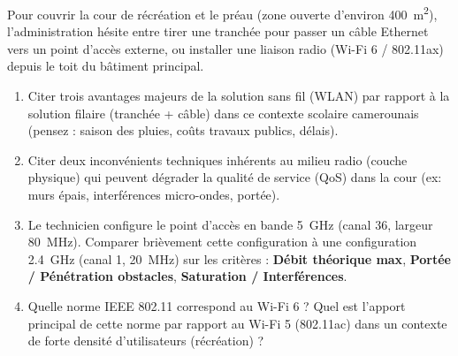 \documentclass[11pt]{article}
\begin{document}
\begin{exercice}
Pour couvrir la cour de récréation et le préau (zone ouverte d'environ \SI{400}{m^2}), l'administration hésite entre tirer une tranchée pour passer un câble Ethernet vers un point d'accès externe, ou installer une liaison radio (Wi-Fi 6 / 802.11ax) depuis le toit du bâtiment principal.

\begin{enumerate}
    \item Citer trois avantages majeurs de la solution sans fil (WLAN) par rapport à la solution filaire (tranchée + câble) dans ce contexte scolaire camerounais (pensez : saison des pluies, coûts travaux publics, délais).
    \item Citer deux inconvénients techniques inhérents au milieu radio (couche physique) qui peuvent dégrader la qualité de service (QoS) dans la cour (ex: murs épais, interférences micro-ondes, portée).
    \item Le technicien configure le point d'accès en bande \SI{5}{GHz} (canal 36, largeur \SI{80}{MHz}). Comparer brièvement cette configuration à une configuration \SI{2,4}{GHz} (canal 1, \SI{20}{MHz}) sur les critères : \textbf{Débit théorique max}, \textbf{Portée / Pénétration obstacles}, \textbf{Saturation / Interférences}.
    \item Quelle norme IEEE 802.11 correspond au \og Wi-Fi 6 \fg ? Quel est l'apport principal de cette norme par rapport au Wi-Fi 5 (802.11ac) dans un contexte de forte densité d'utilisateurs (récréation) ?
\end{enumerate}
\end{exercice}
\end{document}
